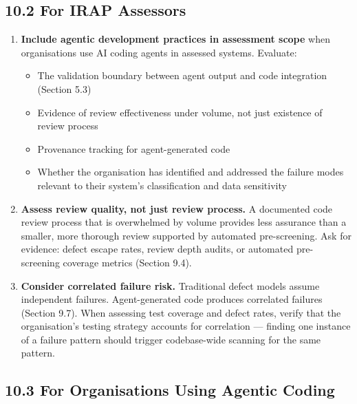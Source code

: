 \documentclass[a4paper,11pt]{report}
\providecommand{\tightlist}{%
  \setlength{\itemsep}{0pt}\setlength{\parskip}{0pt}}
\begin{document}
\hypertarget{for-irap-assessors}{%
\subsection{10.2 For IRAP Assessors}\label{for-irap-assessors}}

\begin{enumerate}
\def\labelenumi{\arabic{enumi}.}
\item
  \textbf{Include agentic development practices in assessment scope}
  when organisations use AI coding agents in assessed systems. Evaluate:

  \begin{itemize}
  \tightlist
  \item
    The validation boundary between agent output and code integration
    (Section 5.3)
  \item
    Evidence of review effectiveness under volume, not just existence of
    review process
  \item
    Provenance tracking for agent-generated code
  \item
    Whether the organisation has identified and addressed the failure
    modes relevant to their system's classification and data sensitivity
  \end{itemize}
\item
  \textbf{Assess review quality, not just review process.} A documented
  code review process that is overwhelmed by volume provides less
  assurance than a smaller, more thorough review supported by automated
  pre-screening. Ask for evidence: defect escape rates, review depth
  audits, or automated pre-screening coverage metrics (Section 9.4).
\item
  \textbf{Consider correlated failure risk.} Traditional defect models
  assume independent failures. Agent-generated code produces correlated
  failures (Section 9.7). When assessing test coverage and defect rates,
  verify that the organisation's testing strategy accounts for
  correlation --- finding one instance of a failure pattern should
  trigger codebase-wide scanning for the same pattern.
\end{enumerate}

\hypertarget{for-organisations-using-agentic-coding}{%
\subsection{10.3 For Organisations Using Agentic
Coding}\label{for-organisations-using-agentic-coding}}
\end{document}
